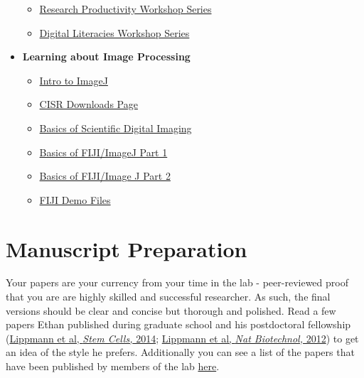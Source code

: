 \documentclass[
]{book}
\begin{document}
\begin{itemize}
  \begin{itemize}
  \item
    \href{https://researchguides.library.vanderbilt.edu/researchproductivityworkshops}{Research Productivity Workshop Series}
  \item
    \href{https://researchguides.library.vanderbilt.edu/digitalliteraciesworkshopseries}{Digital Literacies Workshop Series}
  \end{itemize}
\item
  \textbf{Learning about Image Processing}

  \begin{itemize}
  \item
    \href{https://imagej.net/Introduction}{Intro to ImageJ}
  \item
    \href{https://my.vanderbilt.edu/cisr/microscopy-resources/downloads/}{CISR Downloads Page}
  \item
    \href{https://benchfly.com/video/5781/basics-of-scientific-digital-imaging/}{Basics of Scientific Digital Imaging}
  \item
    \href{https://benchfly.com/video/5496/basics-of-fiji-imagej-part-1/}{Basics of FIJI/ImageJ Part 1}
  \item
    \href{https://benchfly.com/video/5605/basics-of-fiji-imagej-part-2/}{Basics of FIJI/Image J Part 2}
  \item
    \href{https://www.dropbox.com/sh/0k4z8z8hpofd5a0/AABPEkTbxkLzWVxsmpKNkVSja?dl=0}{FIJI Demo Files}
  \end{itemize}
\end{itemize}

\hypertarget{manuscript-preparation}{%
\chapter{Manuscript Preparation}\label{manuscript-preparation}}

Your papers are your currency from your time in the lab - peer-reviewed proof that you are are highly skilled and successful researcher. As such, the final versions should be clear and concise but thorough and polished. Read a few papers Ethan published during graduate school and his postdoctoral fellowship (\href{https://stemcellsjournals-onlinelibrary-wiley-com.proxy.library.vanderbilt.edu/doi/full/10.1002/stem.1622}{Lippmann et al, \emph{Stem Cells,} 2014}; \href{https://www-nature-com.proxy.library.vanderbilt.edu/articles/nbt.2247}{Lippmann et al, \emph{Nat Biotechnol,} 2012}) to get an idea of the style he prefers. Additionally you can see a list of the papers that have been published by members of the lab \href{http://www.lippmannlab.com/publications}{here}.
\end{document}
